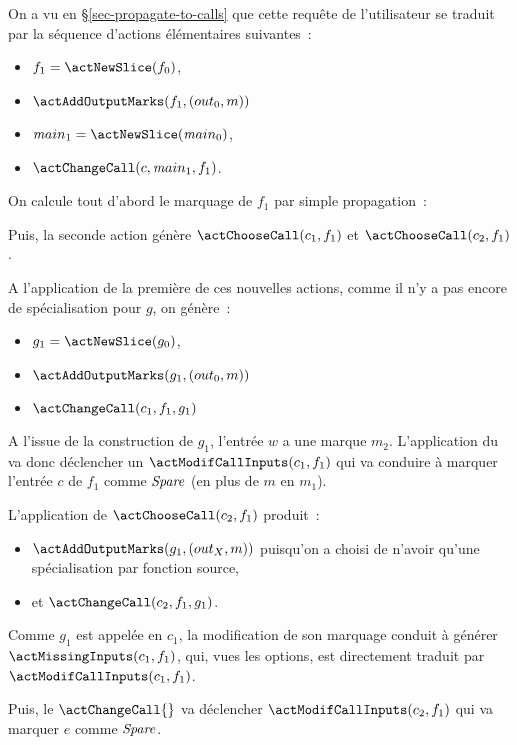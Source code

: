 On a vu en \S\ref{sec-propagate-to-calls} que cette requête de l'utilisateur se
traduit par la séquence d'actions élémentaires suivantes~:
\begin{itemize}
  \item $f_1 = \actNewSlice (f_0)$,
  \item $\actAddOutputMarks(f_1, (out_0, m))$
  \item ${\mathit main}_1 = \actNewSlice ({\mathit main}_0)$,
  \item $\actChangeCall(c, {\mathit main}_1, f_1)$.
\end{itemize}

On calcule tout d'abord le marquage de $f_1$ par simple propagation~:

\bb

Puis, la seconde action
génère $\actChooseCall(c_1, f_1)$ et $\actChooseCall(c_2, f_1)$.

A l'application de la première de ces nouvelles actions,
comme il n'y a pas encore de spécialisation pour $g$, 
on génère~:

\begin{itemize}
  \item $g_1 = \actNewSlice (g_0)$,
  \item $\actAddOutputMarks(g_1, (out_0, m))$
  \item $\actChangeCall(c_1, f_1, g_1)$
\end{itemize}

A l'issue de la construction de $g_1$, l'entrée $w$ a une marque $m_2$.
L'application du \actChangeCall{}
va donc déclencher un $\actModifCallInputs(c_1, f_1)$ qui va conduire à marquer
l'entrée $c$ de $f_1$ comme $\mathit{Spare}$ (en plus de $m$ en $m_1$).

\bb

L'application de $\actChooseCall(c_2, f_1)$ produit~:
\begin{itemize}
  \item $\actAddOutputMarks(g_1, (out_X, m))$ puisqu'on a choisi de n'avoir
    qu'une spécialisation par fonction source,
  \item et $\actChangeCall(c_2, f_1, g_1)$.
\end{itemize}

Comme $g_1$ est appelée en $c_1$, 
la modification de son marquage conduit à générer $\actMissingInputs(c_1, f_1)$,
qui, vues les options, est directement traduit par 
$\actModifCallInputs(c_1, f_1)$.

Puis, le $\actChangeCall{}$ va déclencher $\actModifCallInputs(c_2, f_1)$
qui va marquer $e$ comme $\mathit{Spare}$.

